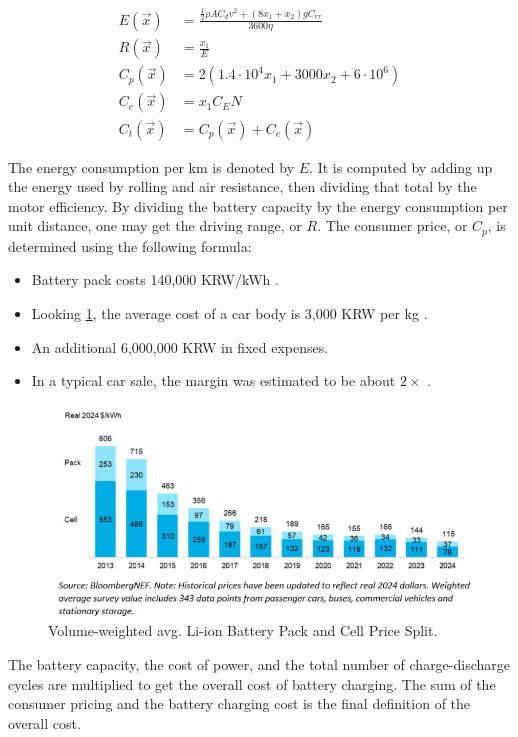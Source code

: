 \documentclass[11pt,twocolumn]{article}
\begin{document}
                \begin{align}
                    \label{eq1begin}
                    E(\vec{x})&=\frac{\frac{1}{2}\rho AC_d v^2 +(8x_1+x_2)gC_{rr}}{3600\eta}\\
                    R(\vec{x})&=\frac{x_1}{E}\\
                    C_{p}(\vec{x})&=2(1.4\cdot 10^4 x_1 +3000x_2 +6\cdot 10^6)\\
                    C_{e}(\vec{x})&=x_1 C_E N\\
                    C_{t}(\vec{x})&=C_{p}(\vec{x})+C_{e}(\vec{x})
                    \label{eq1end}
                \end{align}

                The energy consumption per km is denoted by $E$.
                It is computed by adding up the energy used by rolling and air resistance, then dividing that total by the motor efficiency.
                By dividing the battery capacity by the energy consumption per unit distance, one may get the driving range, or $R$.
                The consumer price, or $C_{p}$, is determined using the following formula:
                \begin{itemize}
                    \item Battery pack costs 140,000 KRW/kWh \cite{140000KRW}.
                    \item Looking \cref{batVolPrice}, the average cost of a car body is 3,000 KRW per kg \cite{3000perkg}.
                    \item An additional 6,000,000 KRW in fixed expenses\cite{600additionalexpenses}.
                    \item In a typical car sale, the margin was estimated to be about $2\times$ \cite{50percentmargine}.
                \end{itemize}
                
                \begin{figure}[h]
                    \centering
                    \includegraphics[width=.8\columnwidth]{batVolPrice.png}
                    \caption{Volume-weighted avg. Li-ion Battery Pack and Cell Price Split.}
                    \label{batVolPrice}
                \end{figure}
                The battery capacity, the cost of power, and the total number of charge-discharge cycles are multiplied to get the overall cost of battery charging.
                The sum of the consumer pricing and the battery charging cost is the final definition of the overall cost.
\end{document}
